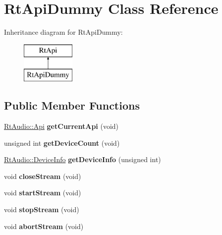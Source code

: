 \hypertarget{class_rt_api_dummy}{}\section{Rt\+Api\+Dummy Class Reference}
\label{class_rt_api_dummy}
Inheritance diagram for Rt\+Api\+Dummy\+:\begin{figure}[H]
\begin{center}
\leavevmode
\includegraphics[height=2.000000cm]{class_rt_api_dummy}
\end{center}
\end{figure}
\subsection*{Public Member Functions}
\begin{DoxyCompactItemize}
\item 
\hyperlink{class_rt_audio_ac9b6f625da88249d08a8409a9db0d849}{Rt\+Audio\+::\+Api} {\bfseries get\+Current\+Api} (void)\hypertarget{class_rt_api_dummy_a7ff0b3ec102299faad6e2449caf4e83d}{}\label{class_rt_api_dummy_a7ff0b3ec102299faad6e2449caf4e83d}

\item 
unsigned int {\bfseries get\+Device\+Count} (void)\hypertarget{class_rt_api_dummy_abd6e4121dca8d5b9d162aa1c51fc7f3e}{}\label{class_rt_api_dummy_abd6e4121dca8d5b9d162aa1c51fc7f3e}

\item 
\hyperlink{struct_rt_audio_1_1_device_info}{Rt\+Audio\+::\+Device\+Info} {\bfseries get\+Device\+Info} (unsigned int)\hypertarget{class_rt_api_dummy_a1373a7859d0baad8bdb1ba89312d1914}{}\label{class_rt_api_dummy_a1373a7859d0baad8bdb1ba89312d1914}

\item 
void {\bfseries close\+Stream} (void)\hypertarget{class_rt_api_dummy_a3c977f919de64b6fc232c3b7d012d226}{}\label{class_rt_api_dummy_a3c977f919de64b6fc232c3b7d012d226}

\item 
void {\bfseries start\+Stream} (void)\hypertarget{class_rt_api_dummy_af5fff1f6a68cfbde8c243f23b18d62dd}{}\label{class_rt_api_dummy_af5fff1f6a68cfbde8c243f23b18d62dd}

\item 
void {\bfseries stop\+Stream} (void)\hypertarget{class_rt_api_dummy_ae107020b6e369376050df702ee55d5ae}{}\label{class_rt_api_dummy_ae107020b6e369376050df702ee55d5ae}

\item 
void {\bfseries abort\+Stream} (void)\hypertarget{class_rt_api_dummy_ad6e5a08e9ead62580d7558e6f67f95f2}{}\label{class_rt_api_dummy_ad6e5a08e9ead62580d7558e6f67f95f2}

\end{DoxyCompactItemize}
